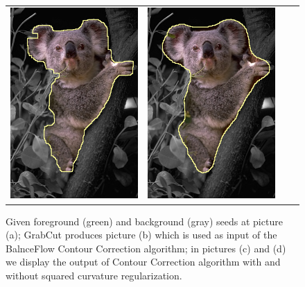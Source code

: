 \begin{figure}
\begin{tabular}{cccc}
 	\includegraphics[scale=0.25]{figures/chapter7/segmentation/coala/k-0.0/corrected-seg.png} &  	
 	\includegraphics[scale=0.25]{figures/chapter7/segmentation/coala/k-1.0/corrected-seg.png}
\end{tabular}	
\caption{Given foreground (green) and background (gray) seeds at picture (a); GrabCut produces picture (b) which is used as input of the BalnceFlow Contour Correction algorithm; in pictures (c) and (d) we display the output of Contour Correction algorithm with and without squared curvature regularization. }
\label{fig:ch7-segmentation}
\end{figure}


